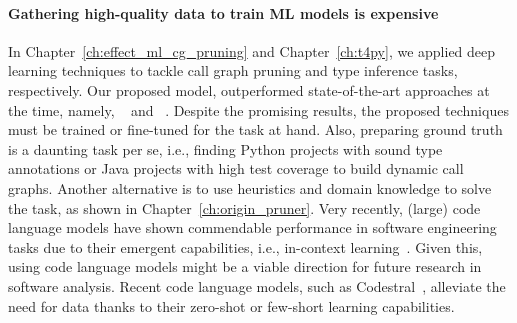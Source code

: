 \paragraph{Gathering high-quality data to train ML models is expensive} In Chapter~\ref{ch:effect_ml_cg_pruning} and Chapter~\ref{ch:t4py}, we applied deep learning techniques to tackle call graph pruning and type inference tasks, respectively. Our proposed model,  outperformed state-of-the-art approaches at the time, namely, ~\cite{allamanis2020typilus} and ~\cite{pradel2019typewriter}. Despite the promising results, the proposed techniques must be trained or fine-tuned for the task at hand. Also, preparing ground truth is a daunting task per se, i.e., finding Python projects with sound type annotations or Java projects with high test coverage to build dynamic call graphs. Another alternative is to use heuristics and domain knowledge to solve the task, as shown in Chapter~\ref{ch:origin_pruner}. Very recently, (large) code language models have shown commendable performance in software engineering tasks due to their emergent capabilities, i.e., in-context learning~\cite{zheng2023survey}. Given this, using code language models might be a viable direction for future research in software analysis. Recent code language models, such as Codestral~\cite{codestral}, alleviate the need for data thanks to their zero-shot or few-short learning capabilities.


